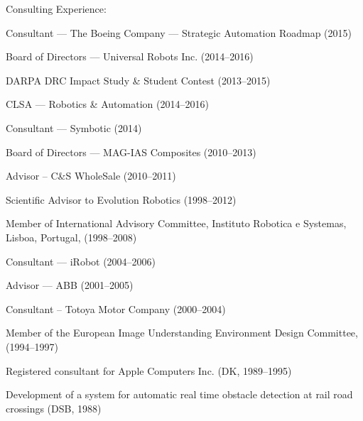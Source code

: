 \documentclass{article}
\newenvironment{sublist}{%
  \begin{list}{}{%
      \setlength{\itemsep}{0em}\setlength{\parsep}{0em}%
      \setlength{\topsep}{0em}\setlength{\parskip}{0em}%
    }%
}%
{ \end{list} }
\begin{document}
\begin{cv}
\begin{cvlist}{Consulting Experience:}
\begin{sublist}
			\item Consultant --- The Boeing Company --- Strategic Automation Roadmap (2015)
			\item Board of Directors --- Universal Robots Inc. (2014--2016)
			\item DARPA DRC Impact Study \& Student Contest (2013--2015)
			\item CLSA --- Robotics \& Automation (2014--2016)
			\item Consultant --- Symbotic (2014)
			\item Board of Directors --- MAG-IAS Composites  (2010--2013)
			\item Advisor -- C\&S WholeSale (2010--2011)
			\item Scientific Advisor to Evolution Robotics (1998--2012)
			\item Member of International Advisory Committee, Instituto Robotica e Systemas, Lisboa, Portugal, (1998--2008)
			\item Consultant --- iRobot (2004--2006)
			\item Advisor --- ABB (2001--2005)
			\item Consultant -- Totoya Motor Company (2000--2004)
			\item Member of the European Image Understanding Environment Design	Committee, (1994--1997)
			\item Registered consultant for Apple Computers Inc. (DK, 1989--1995)
			\item Development of a system for automatic real time obstacle	detection at rail road crossings (DSB, 1988)
		\end{sublist}
	\end{cvlist}



	\begin{cvlist}{~}


\end{cvlist}
\end{cv}
\end{document}
